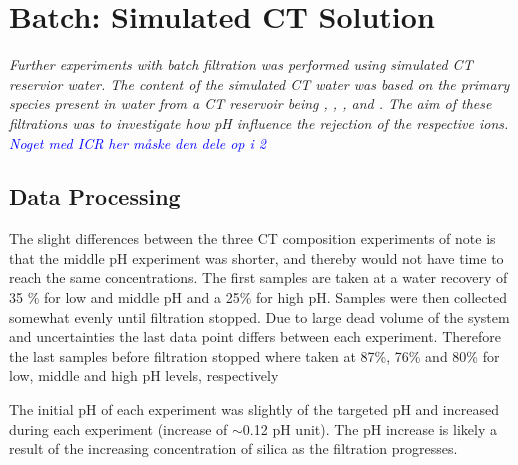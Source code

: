 \chapter{Batch: Simulated CT Solution}

\textit{Further experiments with batch filtration was performed using simulated CT reservior water. The content of the simulated CT water was based on the primary species present in water from a CT reservoir being ,  , ,  and .
The aim of these filtrations was to investigate how pH influence the rejection of the respective ions. 
\textcolor{blue}{Noget med ICR her måske den dele op i 2}
}




\section{Data Processing }


The slight differences between the three CT composition experiments of note is that the middle pH experiment was shorter, and thereby would not have time to reach the same concentrations.
The first samples are taken at a water recovery of 35 \% for low and middle pH and a 25\% for high pH.
Samples were then collected somewhat evenly until filtration stopped.
Due to large dead volume of the system and uncertainties the last data point differs between each experiment.
Therefore the last samples before filtration stopped where taken at 87\%, 76\% and  80\% for low, middle and high pH levels, respectively

The initial pH of each experiment was slightly of the targeted pH and increased during each experiment (increase of $\sim$0.12 pH unit).
The pH increase is likely a result of the increasing concentration of silica as the filtration progresses.

